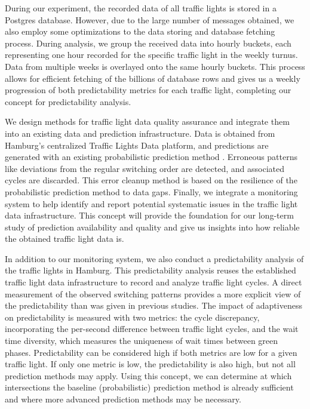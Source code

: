 During our experiment, the recorded data of all traffic lights is stored in a Postgres database. However, due to the large number of messages obtained, we also employ some optimizations to the data storing and database fetching process. During analysis, we group the received data into hourly buckets, each representing one hour recorded for the specific traffic light in the weekly turnus. Data from multiple weeks is overlayed onto the same hourly buckets. This process allows for efficient fetching of the billions of database rows and gives us a weekly progression of both predictability metrics for each traffic light, completing our concept for predictability analysis.

\begin{Summary}
We design methods for traffic light data quality assurance and integrate them into an existing data and prediction infrastructure. Data is obtained from Hamburg's centralized Traffic Lights Data platform, and predictions are generated with an existing probabilistic prediction method \cite{pape_untersuchung_2012, protschky_extensive_2014, protschky_adaptive_2014}. Erroneous patterns like deviations from the regular switching order are detected, and associated cycles are discarded. This error cleanup method is based on the resilience of the probabilistic prediction method to data gaps. Finally, we integrate a monitoring system to help identify and report potential systematic issues in the traffic light data infrastructure. This concept will provide the foundation for our long-term study of prediction availability and quality and give us insights into how reliable the obtained traffic light data is.

In addition to our monitoring system, we also conduct a predictability analysis of the traffic lights in Hamburg. This predictability analysis reuses the established traffic light data infrastructure to record and analyze traffic light cycles. A direct measurement of the observed switching patterns provides a more explicit view of the predictability than was given in previous studies. The impact of adaptiveness on predictability is measured with two metrics: the cycle discrepancy, incorporating the per-second difference between traffic light cycles, and the wait time diversity, which measures the uniqueness of wait times between green phases. Predictability can be considered high if both metrics are low for a given traffic light. If only one metric is low, the predictability is also high, but not all prediction methods may apply. Using this concept, we can determine at which intersections the baseline (probabilistic) prediction method is already sufficient and where more advanced prediction methods may be necessary.
\end{Summary}

